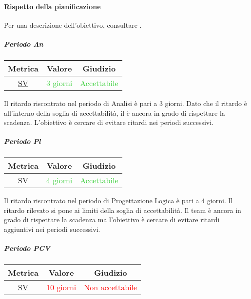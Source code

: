 \newpage

			\paragraph{Rispetto della pianificazione}
			Per una descrizione dell'obiettivo, consultare .
			\label{RRDP}
			
				\subparagraph{Periodo An}
					\begin{table}[H]
						\centering
						\begin{tabular}{  c | c | c}
							\hline
							\textbf{Metrica} & \textbf{Valore} & \textbf{Giudizio} \\
							\hline
							\hyperref[MRDB]{SV}    & \textcolor{LimeGreen}{3 giorni}      & \textcolor{LimeGreen}{Accettabile}  \\\hline
						\end{tabular}
					\end{table}
				
					Il ritardo riscontrato nel periodo di Analisi è pari a 3 giorni. Dato che il ritardo è all'interno della soglia di accettabilità, il  è ancora in grado di rispettare la scadenza. L'obiettivo è cercare di evitare ritardi nei periodi successivi.
			
			
				\subparagraph{Periodo Pl}
				
				\begin{table}[H]
					\centering
					\begin{tabular}{  c | c | c}
						\hline
						\textbf{Metrica} & \textbf{Valore} & \textbf{Giudizio} \\
						\hline
						\hyperref[MRDB]{SV}    & \textcolor{LimeGreen}{4 giorni}      & \textcolor{LimeGreen}{Accettabile}  \\\hline
					\end{tabular}
				\end{table}
			
					Il ritardo riscontrato nel periodo di Progettazione Logica è pari a 4 giorni. Il ritardo rilevato si pone ai limiti della soglia di accettabilità. Il team è ancora in grado di rispettare la scadenza ma l'obiettivo è cercare di evitare ritardi aggiuntivi nei periodi successivi.
					
					\subparagraph{Periodo PCV}
					
					\begin{table}[H]
						\centering
						\begin{tabular}{  c | c | c}
							\hline
							\textbf{Metrica} & \textbf{Valore} & \textbf{Giudizio} \\
							\hline
							\hyperref[MRDB]{SV}    & \textcolor{Red}{10 giorni}      & \textcolor{Red}{Non accettabile}  \\\hline
						\end{tabular}
					\end{table}
					
